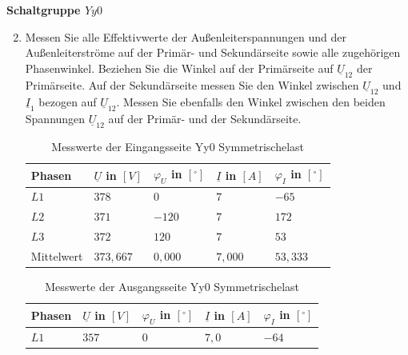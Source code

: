 \pagebreak
\textbf{Schaltgruppe $Yy0$}
\begin{enumerate}[label=\alph*)]
  \setcounter{enumi}{1}
  \item Messen Sie alle Effektivwerte der Außenleiterspannungen und der
        Außenleiterströme auf der Primär- und Sekundärseite sowie alle zugehörigen
        Phasenwinkel. Beziehen Sie die Winkel auf der Primärseite auf $\underline
          U_{12}$ der Primärseite. Auf der Sekundärseite messen Sie den Winkel zwischen
        $\underline U_{12}$ und $\underline I_1$ bezogen auf $\underline U_{12}$.
        Messen Sie ebenfalls den Winkel zwischen den beiden Spannungen $\underline
          U_{12}$ auf der Primär- und der Sekundärseite.

        \begin{table}[h!]
          \caption{Messwerte der Eingangsseite Yy0 Symmetrischelast}
          \centering
          \begin{tabular}{lllll}
            \\ \hline
            Phasen     & $\underline{U}$ in $[V]$ & $\varphi_{U}$ in $[^\circ]$ & $\underline{I}$ in $[A]$ & $\varphi_{I}$ in $[^\circ]$ \\ \hline
            $L1$       & $378$                    & $0$                         & $7$                      & $-65$                       \\
            $L2$       & $371$                    & $-120$                      & $7$                      & $172$                       \\
            $L3$       & $372$                    & $120$                       & $7$                      & $53$                        \\ \hline
            Mittelwert & $373,667$                & $0,000$                     & $7,000$                  & $53,333$                    \\ \hline\hline
          \end{tabular}
        \end{table}
        \begin{table}[h!]
          \centering
          \caption{Messwerte der Ausgangsseite Yy0 Symmetrischelast}
          \begin{tabular}{lllll}
            \\ \hline
            Phasen     & $\underline{U}$ in $[V]$ & $\varphi_{U}$ in $[^\circ]$ & $\underline{I}$ in $[A]$ & $\varphi_{I}$ in $[^\circ]$ \\ \hline
            $L1$       & $357$                    & $0$                         & $7,0$                    & $-64$                       \\

\end{tabular}
\end{table}
\end{enumerate}
